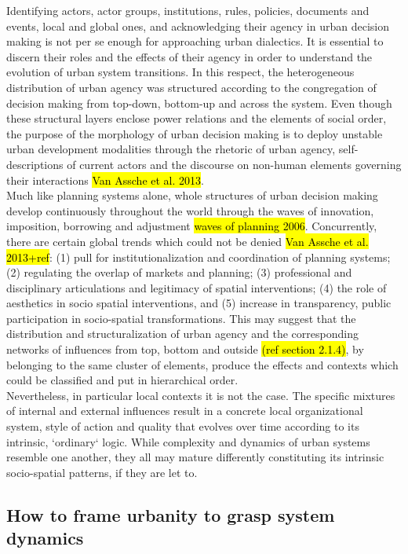 \documentclass[11pt]{report}
\begin{document}
Identifying actors, actor groups, institutions, rules, policies, documents and events, local and global ones, and acknowledging their agency in urban decision making is not per se enough for approaching urban dialectics.
It is essential to discern their roles and the effects of their agency in order to understand the evolution of urban system transitions.
In this respect, the heterogeneous distribution of urban agency was structured according to the congregation of decision making from top-down, bottom-up and across the system.
Even though these structural layers enclose power relations and the elements of social order, the purpose of the morphology of urban decision making is to deploy unstable urban development modalities 
through the rhetoric of urban agency, self-descriptions of current actors and the discourse on non-human elements governing their interactions \hl{Van Assche et al. 2013}. 
\\
Much like planning systems alone, whole structures of urban decision making develop continuously throughout the world through the waves of innovation,  imposition,  borrowing  and  adjustment \hl{waves of planning 2006}.
Concurrently, there are certain global trends which could not be denied \hl{Van Assche et al. 2013+ref}: (1) pull for institutionalization and coordination of planning systems; (2) regulating the overlap of markets and planning; (3) professional and disciplinary articulations and legitimacy of spatial interventions; (4) the role of aesthetics in socio spatial interventions, and (5) increase in transparency, public participation in socio-spatial transformations.
This may suggest that the distribution and structuralization of urban agency and the corresponding networks of influences {from top, bottom and outside \hl{(ref section 2.1.4)}}, by belonging to the same cluster of elements, produce the effects and contexts which could be classified and put in hierarchical order. 
\\
Nevertheless, in particular local contexts it is not the case. The specific mixtures of internal and external influences result in a concrete local organizational system, style of action and quality that evolves over time according to its intrinsic, `ordinary` logic.
While complexity and dynamics of urban systems resemble one another, they all may mature differently constituting its intrinsic socio-spatial patterns, if they are let to.

\subsection{How to frame urbanity to grasp system dynamics}
\end{document}
